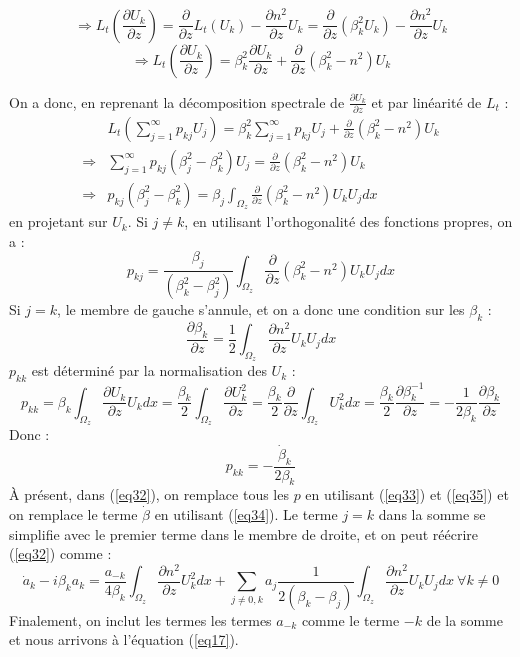 \documentclass{article}
\begin{document}
\[\Rightarrow L_t\left( \frac{\partial U_k}{\partial z}\right)= \frac{\partial}{\partial z} L_t(U_k)-\frac{\partial n^2}{\partial z}U_k=\frac{\partial}{\partial z} (\beta_k^2U_k)-\frac{\partial n^2}{\partial z}U_k\]
\[\Rightarrow L_t\left( \frac{\partial U_k}{\partial z}\right)= \beta_k^2\frac{\partial U_k}{\partial z} + \frac{\partial}{\partial z}(\beta_k^2-n^2)U_k\]

On a donc, en reprenant la décomposition spectrale de $\frac{\partial U_k}{\partial z}$ et par linéarité de $L_t$ :
\begin{eqnarray*}
&L_t\left( \sum_{j=1}^\infty p_{kj}U_j\right)=\beta_k^2\sum_{j=1}^\infty p_{kj}U_j + \frac{\partial}{\partial z}(\beta_k^2-n^2)U_k\\
\Rightarrow& \sum_{j=1}^\infty p_{kj}(\beta_j^2-\beta_k^2)U_j=\frac{\partial}{\partial z}(\beta_k^2-n^2)U_k\\
\Rightarrow& p_{kj}(\beta_j^2-\beta_k^2)=\beta_j\int_{\Omega_z}\frac{\partial}{\partial z}(\beta_k^2-n^2)U_kU_j dx
\end{eqnarray*}
en projetant sur $U_k$. Si $j\neq k$, en utilisant l'orthogonalité des fonctions propres, on a :
\begin{equation}\label{eq33}
	p_{kj}=\frac{\beta_j}{(\beta_k^2-\beta_j^2)}\int_{\Omega_z}\frac{\partial}{\partial z}(\beta_k^2-n^2)U_kU_j dx
\end{equation}
Si $j=k$, le membre de gauche s'annule, et on a donc une condition sur les $\beta_k$ :
\begin{equation}\label{eq34}
	\frac{\partial \beta_k}{\partial z}=\frac{1}{2}\int_{\Omega_z} \frac{\partial n^2}{\partial z}U_kU_j dx
\end{equation}
$p_{kk}$ est déterminé par la normalisation des $U_k$ :
\[p_{kk}=\beta_k\int_{\Omega_z} \frac{\partial U_k}{\partial z}U_kdx=\frac{\beta_k}{2}\int_{\Omega_z} \frac{\partial U_k^2}{\partial z}=\frac{\beta_k}{2}\frac{\partial}{\partial z}\int_{\Omega_z} U_k^2dx = \frac{\beta_k}{2}\frac{\partial \beta_k^{-1}}{\partial z}=-\frac{1}{2\beta_k}\frac{\partial \beta_k}{\partial z}\]
Donc : \begin{equation}\label{eq35} p_{kk}=-\frac{\dot{\beta}_k}{2\beta_k} \end{equation}
À présent, dans (\ref{eq32}), on remplace tous les $p$ en utilisant (\ref{eq33}) et (\ref{eq35}) et on remplace le terme $\dot{\beta}$ en utilisant (\ref{eq34}). Le terme $j=k$ dans la somme se simplifie avec le premier terme dans le membre de droite, et on peut réécrire (\ref{eq32}) comme :
\[
\dot{a}_k-i\beta_ka_k=\frac{a_{-k}}{4\beta_k}\int_{\Omega_z}\frac{\partial n^2}{\partial z}U_k^2dx + \sum_{j\neq 0,k} a_j\frac{1}{2(\beta_k-\beta_j)}\int_{\Omega_z}\frac{\partial n^2}{\partial z}U_kU_jdx\ \forall k\neq 0
\]
Finalement, on inclut les termes les termes $a_{-k}$ comme le terme $-k$ de la somme et nous arrivons à l'équation (\ref{eq17}).



\end{document}
